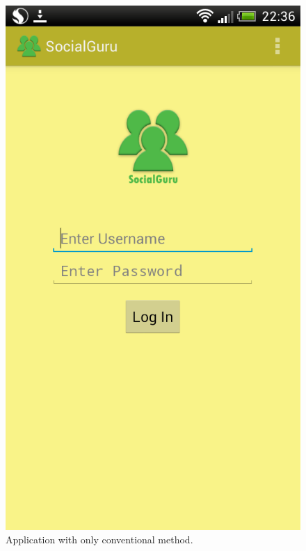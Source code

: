 \begin{figure}[H]
\centering
\includegraphics[scale=0.3]{images/nolibrary.png}
\caption{Application with only conventional method.}
\label{fig:nolibrary}
\end{figure}

